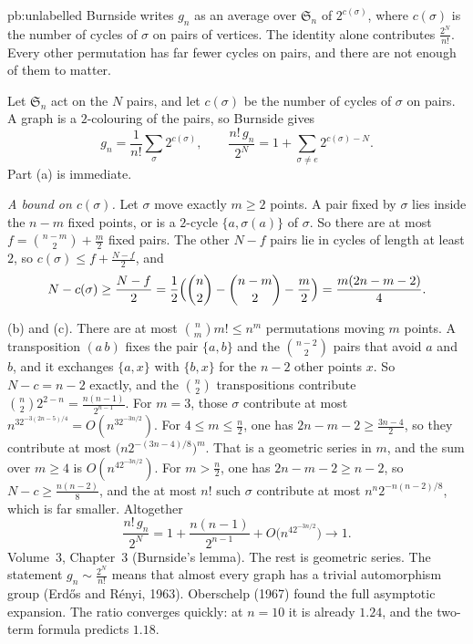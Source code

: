 \begin{solution}{pb:unlabelled}
\idea Burnside writes $g_n$ as an average over $\mathfrak S_n$ of $2^{c(\sigma)}$, where $c(\sigma)$ is the number of cycles of $\sigma$ on pairs of vertices. The identity alone contributes $\frac{2^N}{n!}$. Every other permutation has far fewer cycles on pairs, and there are not enough of them to matter.

\writeup Let $\mathfrak S_n$ act on the $N$ pairs, and let $c(\sigma)$ be the number of cycles of $\sigma$ on pairs. A graph is a $2$-colouring of the pairs, so Burnside gives
\[
g_n=\frac1{n!}\sum_\sigma2^{c(\sigma)},\qquad\frac{n!\,g_n}{2^N}=1+\sum_{\sigma\ne e}2^{c(\sigma)-N}.
\]
Part (a) is immediate.

\emph{A bound on $c(\sigma)$.} Let $\sigma$ move exactly $m\ge2$ points. A pair fixed by $\sigma$ lies inside the $n-m$ fixed points, or is a $2$-cycle $\{a,\sigma(a)\}$ of $\sigma$. So there are at most $f=\binom{n-m}2+\frac m2$ fixed pairs. The other $N-f$ pairs lie in cycles of length at least $2$, so $c(\sigma)\le f+\frac{N-f}2$, and
\[
N-c(\sigma)\ge\frac{N-f}2=\frac12\Bigl(\binom n2-\binom{n-m}2-\frac m2\Bigr)=\frac{m(2n-m-2)}4.
\]

(b) and (c). There are at most $\binom nm m!\le n^m$ permutations moving $m$ points. A transposition $(a\,b)$ fixes the pair $\{a,b\}$ and the $\binom{n-2}2$ pairs that avoid $a$ and $b$, and it exchanges $\{a,x\}$ with $\{b,x\}$ for the $n-2$ other points $x$. So $N-c=n-2$ exactly, and the $\binom n2$ transpositions contribute $\binom n22^{2-n}=\frac{n(n-1)}{2^{n-1}}$. For $m=3$, those $\sigma$ contribute at most $n^32^{-3(2n-5)/4}=O(n^32^{-3n/2})$. For $4\le m\le\frac n2$, one has $2n-m-2\ge\frac{3n-4}2$, so they contribute at most $\bigl(n2^{-(3n-4)/8}\bigr)^m$. That is a geometric series in $m$, and the sum over $m\ge4$ is $O(n^42^{-3n/2})$. For $m>\frac n2$, one has $2n-m-2\ge n-2$, so $N-c\ge\frac{n(n-2)}8$, and the at most $n!$ such $\sigma$ contribute at most $n^n2^{-n(n-2)/8}$, which is far smaller. Altogether
\[
\frac{n!\,g_n}{2^N}=1+\frac{n(n-1)}{2^{n-1}}+O\bigl(n^42^{-3n/2}\bigr)\longrightarrow1.
\]
\tools Volume~3, Chapter~3 (Burnside's lemma). The rest is geometric series.
\leads The statement $g_n\sim\frac{2^N}{n!}$ means that almost every graph has a trivial automorphism group (Erdős and Rényi, 1963). Oberschelp (1967) found the full asymptotic expansion. The ratio converges quickly: at $n=10$ it is already $1.24$, and the two-term formula predicts $1.18$.
\end{solution}

